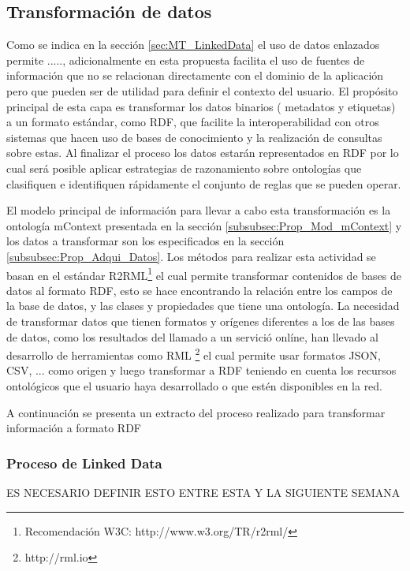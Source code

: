 \subsection{Transformación de datos}
\label{subsec:Prop_TransDatos}

Como se indica en la sección \ref{sec:MT_LinkedData} el uso de datos enlazados permite ....., adicionalmente en esta propuesta facilita el uso de fuentes de información que no se relacionan directamente con el dominio de la aplicación pero que pueden ser de utilidad para definir el contexto del usuario. El propósito principal de esta capa es transformar los datos binarios ( metadatos y etiquetas) a un formato estándar, como RDF, que facilite la interoperabilidad con otros sistemas que hacen uso de bases de conocimiento y la realización de consultas sobre estas. Al finalizar el proceso los datos estarán representados en RDF por lo cual será posible aplicar estrategias de razonamiento sobre ontologías que clasifiquen e identifiquen rápidamente el conjunto de reglas que se pueden operar.

El modelo principal de información para llevar a cabo esta transformación es la ontología mContext presentada en la sección \ref{subsubsec:Prop_Mod_mContext} y los datos a transformar son los especificados en la sección \ref{subsubsec:Prop_Adqui_Datos}. Los métodos para realizar esta actividad se basan en el estándar R2RML\footnote{Recomendación W3C: http://www.w3.org/TR/r2rml/} el cual permite transformar contenidos de bases de datos al formato RDF, esto se hace encontrando la relación entre los campos de la base de datos, y las clases y propiedades que tiene una ontología. La necesidad de transformar datos que tienen formatos y orígenes diferentes a los de las bases de datos, como los resultados del llamado a un servició onlíne, han llevado al desarrollo de herramientas como RML \footnote{http://rml.io} el cual permite usar formatos JSON, CSV, ... como origen y luego transformar a RDF teniendo en cuenta los recursos ontológicos que el usuario haya desarrollado o que estén disponibles en la red.

A continuación se presenta un extracto del proceso realizado para transformar información a formato RDF




\subsubsection{Proceso de Linked Data}
\label{subsubsec:Prop_TransData_LD}
ES NECESARIO DEFINIR ESTO ENTRE ESTA Y LA SIGUIENTE SEMANA